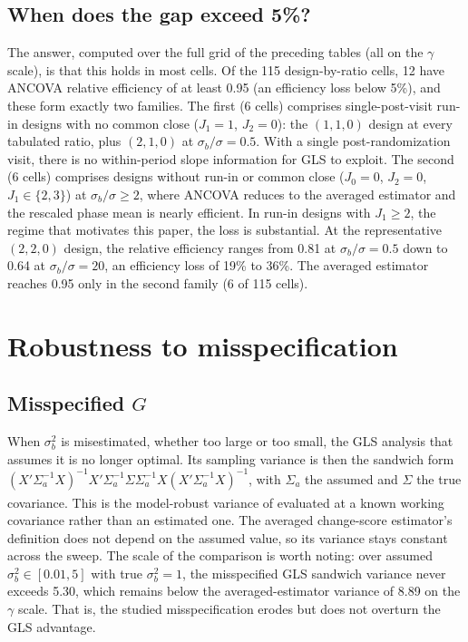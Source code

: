 \documentclass[
  11pt,
]{article}
\begin{document}
\subsection{When does the gap exceed 5\%?}\label{when-does-the-gap-exceed-5}

The answer, computed over the full grid of the preceding
tables (all on the \(\gamma\) scale), is that this holds
in most cells. Of the 115 design-by-ratio cells,
12 have ANCOVA relative efficiency of at least
0.95 (an efficiency loss below 5\%), and these form
exactly two families. The first (6 cells)
comprises single-post-visit run-in designs with no
common close (\(J_1 = 1\), \(J_2 = 0\)): the \((1,1,0)\)
design at every tabulated ratio, plus \((2,1,0)\) at
\(\sigma_b/\sigma = 0.5\). With a single post-randomization
visit, there is no within-period slope information for
GLS to exploit. The second (6 cells) comprises
designs without run-in or common close (\(J_0 = 0\),
\(J_2 = 0\), \(J_1 \in \{2, 3\}\)) at
\(\sigma_b/\sigma \ge 2\), where ANCOVA reduces to the
averaged estimator and the rescaled phase mean is nearly
efficient. In run-in designs with \(J_1 \ge 2\), the
regime that motivates this paper, the loss is
substantial. At the representative \((2,2,0)\) design, the
relative efficiency ranges from
0.81 at
\(\sigma_b/\sigma = 0.5\) down to
0.64 at
\(\sigma_b/\sigma = 20\), an efficiency loss of 19\% to
36\%. The averaged estimator reaches 0.95 only in the
second family (6 of 115 cells).

\section{Robustness to misspecification}\label{robustness-to-misspecification}

\subsection{\texorpdfstring{Misspecified \(G\)}{Misspecified G}}\label{misspecified-g}

When \(\sigma_b^2\) is misestimated, whether too large
or too small, the GLS analysis that assumes it is no
longer optimal. Its sampling variance is then the
sandwich form
\((X'\Sigma_a^{-1}X)^{-1}
 X'\Sigma_a^{-1}\Sigma\Sigma_a^{-1}X
 (X'\Sigma_a^{-1}X)^{-1}\),
with \(\Sigma_a\) the assumed and \(\Sigma\) the true
covariance. This is the model-robust variance of\textsuperscript{} evaluated at a known working covariance
rather than an estimated one. The averaged change-score
estimator's definition does not depend on the assumed
value, so its variance stays constant across the sweep.
The scale of the comparison is worth noting: over
assumed \(\sigma_b^2 \in [0.01, 5]\) with true
\(\sigma_b^2 = 1\), the misspecified GLS sandwich variance
never exceeds 5.30, which remains below the
averaged-estimator variance of 8.89 on the \(\gamma\)
scale. That is, the studied misspecification erodes but
does not overturn the GLS advantage.
\end{document}
